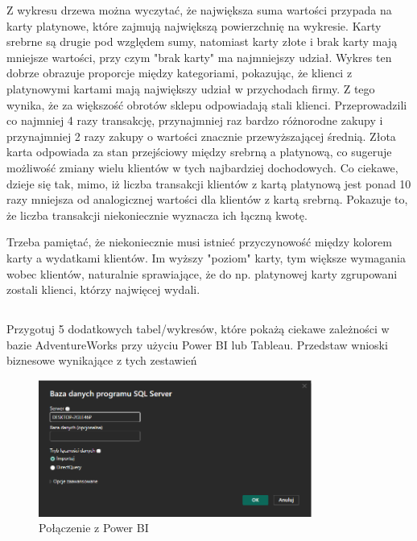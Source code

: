 \documentclass[a4paper,12pt]{article}
\begin{document}
Z wykresu drzewa można wyczytać, że największa suma wartości przypada na karty platynowe, które zajmują największą powierzchnię na wykresie. Karty srebrne są drugie pod względem sumy, natomiast karty złote i brak karty mają mniejsze wartości, przy czym "brak karty" ma najmniejszy udział. Wykres ten dobrze obrazuje proporcje między kategoriami, pokazując, że klienci z platynowymi kartami mają największy udział w przychodach firmy. Z tego wynika, że za większość obrotów sklepu odpowiadają stali klienci. Przeprowadzili co najmniej 4 razy transakcję, przynajmniej raz bardzo różnorodne zakupy i przynajmniej 2 razy zakupy o wartości znacznie przewyższającej średnią. Złota karta odpowiada za stan przejściowy między srebrną a platynową, co sugeruje możliwość zmiany wielu klientów w tych najbardziej dochodowych. Co ciekawe, dzieje się tak, mimo, iż liczba transakcji klientów z kartą platynową jest ponad 10 razy mniejsza od analogicznej wartości dla klientów z kartą srebrną. Pokazuje to, że liczba transakcji niekoniecznie wyznacza ich łączną kwotę.

Trzeba pamiętać, że niekoniecznie musi istnieć przyczynowość między kolorem karty a wydatkami klientów. Im wyższy "poziom" karty, tym większe wymagania wobec klientów, naturalnie sprawiające, że do np. platynowej karty zgrupowani zostali klienci, którzy najwięcej wydali.

\subsection{}

Przygotuj 5 dodatkowych tabel/wykresów, które pokażą ciekawe zależności w bazie AdventureWorks przy użyciu Power BI lub Tableau. Przedstaw wnioski biznesowe wynikające z tych zestawień

\begin{figure}[H]
    \centering
    \includegraphics[width=0.8\textwidth]{images/power_bi/connection.png}
    \caption{Połączenie z Power BI}
\end{figure}
\end{document}
